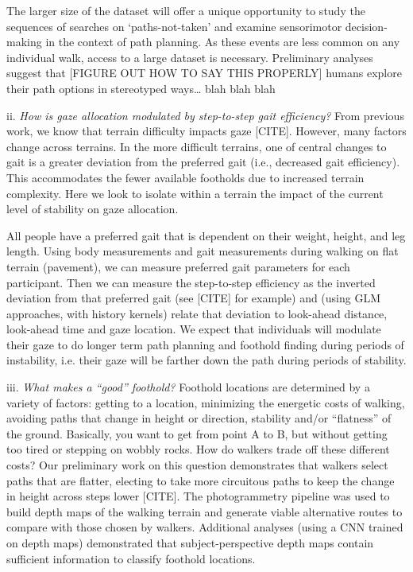 The larger size of the dataset will offer a unique opportunity to study the sequences of searches on `paths-not-taken' and examine sensorimotor decision-making in the context of path planning. As these events are less common on any individual walk, access to a large dataset is necessary. Preliminary analyses suggest that [FIGURE OUT HOW TO SAY THIS PROPERLY] humans explore their path options in stereotyped ways\ldots{} blah blah blah

ii. \emph{How is gaze allocation modulated by step-to-step gait
efficiency?} From previous work, we know that terrain difficulty impacts gaze [CITE]. However, many factors change across terrains. In the more difficult terrains, one of central changes to gait is a greater deviation from the preferred gait (i.e., decreased gait efficiency). This accommodates the fewer available footholds due to increased terrain complexity. Here we look to isolate within a terrain the impact of the current level of stability on gaze allocation.

All people have a preferred gait that is dependent on their weight, height, and leg length. Using body measurements and gait measurements during walking on flat terrain (pavement), we can measure preferred gait parameters for each participant. Then we can measure the step-to-step efficiency as the inverted deviation from that preferred gait (see [CITE] for example) and (using GLM approaches, with history kernels) relate that deviation to look-ahead distance, look-ahead time and gaze location. We
expect that individuals will modulate their gaze to do longer term path planning and foothold finding during periods of instability, i.e. their gaze will be farther down the path during periods of stability.

iii. \emph{What makes a ``good'' foothold?} Foothold locations are
determined by a variety of factors: getting to a location, minimizing the energetic costs of walking, avoiding paths that change in height or direction, stability and/or ``flatness'' of the ground. Basically, you want to get from point A to B, but without getting too tired or stepping on wobbly rocks. How do walkers trade off these different costs? Our preliminary work on this question demonstrates that walkers select paths that are flatter, electing to take more circuitous paths to keep the change in height across steps lower [CITE]. The photogrammetry pipeline was used to build depth maps of the walking terrain and generate viable alternative routes to compare with those chosen by walkers. Additional analyses (using a CNN trained on depth maps) demonstrated that subject-perspective depth maps contain sufficient information to classify foothold locations.

